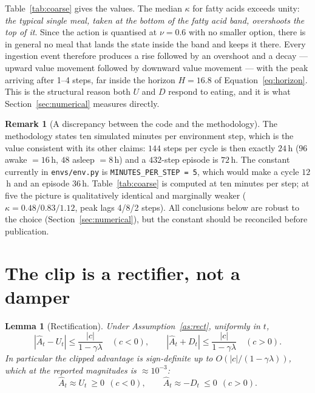 \documentclass[11pt]{article}
\newtheorem{lemma}[theorem]{Lemma}
\theoremstyle{definition}
\newtheorem{remark}[theorem]{Remark}
\newcommand{\Ahat}{\hat A}
\begin{document}
Table~\ref{tab:coarse} gives the values. The median $\kappa$ for fatty acids
exceeds unity: \emph{the typical single meal, taken at the bottom of the fatty
acid band, overshoots the top of it}. Since the action is quantised at
$\nu=0.6$ with no smaller option, there is in general no meal that lands the
state inside the band and keeps it there. Every ingestion event therefore
produces a rise followed by an overshoot and a decay --- upward value movement
followed by downward value movement --- with the peak arriving after 1--4
steps, far inside the horizon $H=16.8$ of Equation~\eqref{eq:horizon}. This is
the structural reason both $U$ and $D$ respond to eating, and it is what
Section~\ref{sec:numerical} measures directly.

\begin{remark}[A discrepancy between the code and the methodology]
\label{rem:mps}
The methodology states ten simulated minutes per environment step, which is
the value consistent with its other claims: $144$ steps per cycle is then
exactly $24$\,h ($96$ awake $=16$\,h, $48$ asleep $=8$\,h) and a $432$-step
episode is $72$\,h. The constant currently in \texttt{envs/env.py} is
\texttt{MINUTES\_PER\_STEP = 5}, which would make a cycle $12$\,h and an
episode $36$\,h. Table~\ref{tab:coarse} is computed at ten minutes per step;
at five the picture is qualitatively identical and marginally weaker
($\kappa=0.48/0.83/1.12$, peak lags 4/8/2 steps). All conclusions below are
robust to the choice (Section~\ref{sec:numerical}), but the constant should be
reconciled before publication.
\end{remark}

\section{The clip is a rectifier, not a damper}
\label{sec:rect}

\begin{lemma}[Rectification]
\label{lem:rect}
Under Assumption~\ref{as:rect}, uniformly in $t$,
\begin{equation}
\left|\Ahat_t-U_t\right|\le\frac{|c|}{1-\gamma\lambda}
\quad (c<0),
\qquad
\left|\Ahat_t+D_t\right|\le\frac{|c|}{1-\gamma\lambda}
\quad (c>0).
\label{eq:rectbound}
\end{equation}
In particular the clipped advantage is sign-definite up to
$O\!\left(|c|/(1-\gamma\lambda)\right)$, which at the reported magnitudes is
$\approx10^{-3}$:
\begin{equation}
\Ahat_t\approx U_t\ \ge0\ \ (c<0),
\qquad
\Ahat_t\approx-D_t\ \le0\ \ (c>0).
\label{eq:signdef}
\end{equation}
\end{lemma}
\end{document}
